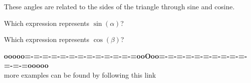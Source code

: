 \documentclass{ximera}
\begin{document}
These angles are related to the sides of the triangle through sine and cosine.










\begin{question} 


Which expression represents $\sin(\alpha)$?

\begin{multipleChoice}
\end{multipleChoice}

\end{question}









\begin{question} 


Which expression represents $\cos(\beta)$?

\begin{multipleChoice}
\end{multipleChoice}

\end{question}
























\begin{center}
\textbf{\textcolor{green!50!black}{ooooo=-=-=-=-=-=-=-=-=-=-=-=-=ooOoo=-=-=-=-=-=-=-=-=-=-=-=-=ooooo}} \\

more examples can be found by following this link\\ 

\end{center}
\end{document}
